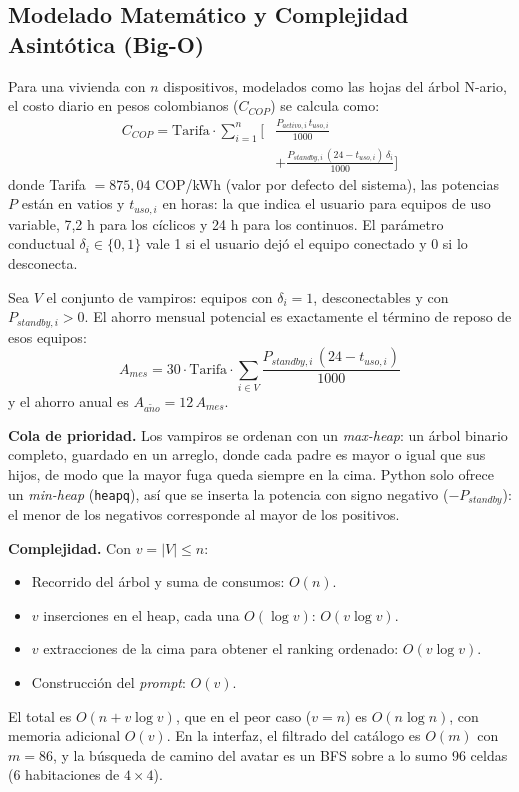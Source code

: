 \documentclass[10pt,journal,compsoc]{IEEEtran}
\begin{document}
\subsection{Modelado Matemático y Complejidad Asintótica (Big-O)}
\label{sec:complejidad}
Para una vivienda con $n$ dispositivos, modelados como las hojas del árbol N-ario, el costo diario en pesos colombianos ($C_{COP}$) se calcula como:
\begin{equation}
\begin{split}
C_{COP} = \text{Tarifa}\cdot\sum_{i=1}^{n}\Bigg[&\frac{P_{activo,i}\,t_{uso,i}}{1000}\\
&+ \frac{P_{standby,i}\,(24-t_{uso,i})\,\delta_i}{1000}\Bigg]
\end{split}
\label{eq:costo}
\end{equation}
donde Tarifa $=875{,}04$ COP/kWh (valor por defecto del sistema), las potencias $P$ están en vatios y $t_{uso,i}$ en horas: la que indica el usuario para equipos de uso variable, 7,2 h para los cíclicos y 24 h para los continuos. El parámetro conductual $\delta_i \in \{0,1\}$ vale 1 si el usuario dejó el equipo conectado y 0 si lo desconecta.

Sea $V$ el conjunto de vampiros: equipos con $\delta_i = 1$, desconectables y con $P_{standby,i} > 0$. El ahorro mensual potencial es exactamente el término de reposo de esos equipos:
\begin{equation}
A_{mes} = 30\cdot\text{Tarifa}\cdot\sum_{i\in V}\frac{P_{standby,i}\,(24-t_{uso,i})}{1000}
\label{eq:ahorro}
\end{equation}
y el ahorro anual es $A_{a\tilde{n}o} = 12\,A_{mes}$.

\textbf{Cola de prioridad.} Los vampiros se ordenan con un \emph{max-heap}: un árbol binario completo, guardado en un arreglo, donde cada padre es mayor o igual que sus hijos, de modo que la mayor fuga queda siempre en la cima. Python solo ofrece un \emph{min-heap} (\texttt{heapq}), así que se inserta la potencia con signo negativo ($-P_{standby}$): el menor de los negativos corresponde al mayor de los positivos.

\textbf{Complejidad.} Con $v = |V| \le n$:
\begin{itemize}
\item Recorrido del árbol y suma de consumos: $O(n)$.
\item $v$ inserciones en el heap, cada una $O(\log v)$: $O(v\log v)$.
\item $v$ extracciones de la cima para obtener el ranking ordenado: $O(v\log v)$.
\item Construcción del \emph{prompt}: $O(v)$.
\end{itemize}
El total es $O(n + v\log v)$, que en el peor caso ($v = n$) es $O(n\log n)$, con memoria adicional $O(v)$. En la interfaz, el filtrado del catálogo es $O(m)$ con $m = 86$, y la búsqueda de camino del avatar es un BFS sobre a lo sumo 96 celdas (6 habitaciones de $4\times4$).
\end{document}
